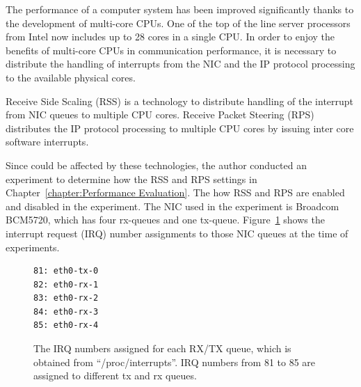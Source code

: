 The performance of a computer system has been improved significantly thanks to the development of multi-core CPUs.
One of the top of the line server processors from Intel now includes up to 28 cores in a single CPU.
In order to enjoy the benefits of multi-core CPUs in communication performance,
it is necessary to distribute the handling of interrupts from the NIC and the  IP protocol processing to the available physical cores.

Receive Side Scaling (RSS) \cite{TomHerbert} is a technology 
to distribute handling of the interrupt from NIC queues to multiple CPU cores.
Receive Packet Steering (RPS) \cite{TomHerbert} distributes the IP protocol processing 
to multiple CPU cores by issuing inter core software interrupts.

Since  could be affected by these technologies,
the author conducted an experiment to determine how  the RSS and RPS settings in Chapter~\ref{chapter:Performance Evaluation}.
The  how RSS and RPS are enabled and disabled in the experiment. 
The NIC used in the experiment is Broadcom BCM5720, which has four rx-queues and one tx-queue.
Figure~\ref{fig:rx-queue} shows the interrupt request (IRQ) number assignments to those NIC queues at the time of experiments.

\begin{figure}[h]
\centering
\begin{minipage}{0.3\columnwidth}
\begin{verbatim}
81: eth0-tx-0
82: eth0-rx-1
83: eth0-rx-2
84: eth0-rx-3
85: eth0-rx-4
\end{verbatim}
\end{minipage}

\par\bigskip
\centering
\begin{minipage}{0.9\columnwidth}
  \caption[The IRQ numbers assigned for each RX/TX queue]{
    The IRQ numbers assigned for each RX/TX queue, which is obtained from \enquote{/proc/interrupts}.
    IRQ numbers from 81 to 85 are assigned to different tx and rx queues.
  }
  \label{fig:rx-queue}
\end{minipage}

\end{figure}

